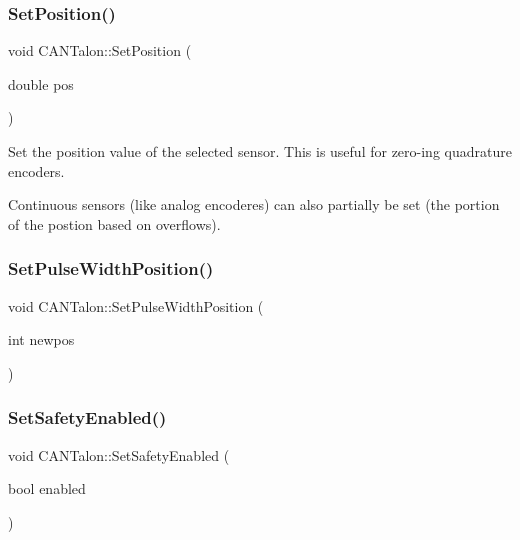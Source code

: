 \subsubsection{\texorpdfstring{Set\+Position()}{SetPosition()}}
{\footnotesize\ttfamily void C\+A\+N\+Talon\+::\+Set\+Position (\begin{DoxyParamCaption}\item[{double}]{pos }\end{DoxyParamCaption})}

Set the position value of the selected sensor. This is useful for zero-\/ing quadrature encoders.

Continuous sensors (like analog encoderes) can also partially be set (the portion of the postion based on overflows). \mbox{\label{class_c_a_n_talon_afab6a73cc6c8c22ac503b247f9cea0f2}} 
\subsubsection{\texorpdfstring{Set\+Pulse\+Width\+Position()}{SetPulseWidthPosition()}}
{\footnotesize\ttfamily void C\+A\+N\+Talon\+::\+Set\+Pulse\+Width\+Position (\begin{DoxyParamCaption}\item[{int}]{newpos }\end{DoxyParamCaption})\hspace{0.3cm}{\ttfamily [virtual]}}

\mbox{\label{class_c_a_n_talon_a1259a78f4e90554be7227a77030aad12}} 
\subsubsection{\texorpdfstring{Set\+Safety\+Enabled()}{SetSafetyEnabled()}}
{\footnotesize\ttfamily void C\+A\+N\+Talon\+::\+Set\+Safety\+Enabled (\begin{DoxyParamCaption}\item[{bool}]{enabled }\end{DoxyParamCaption})\hspace{0.3cm}{\ttfamily [override]}}


